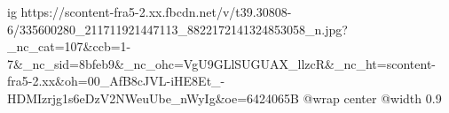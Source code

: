  
 
 
 
 


\ifcmt
  ig https://scontent-fra5-2.xx.fbcdn.net/v/t39.30808-6/335600280_211711921447113_8822172141324853058_n.jpg?_nc_cat=107&ccb=1-7&_nc_sid=8bfeb9&_nc_ohc=VgU9GLlSUGUAX_llzcR&_nc_ht=scontent-fra5-2.xx&oh=00_AfB8cJVL-iHE8Et_-HDMIzrjg1s6eDzV2NWeuUbe_nWyIg&oe=6424065B
  @wrap center
  @width 0.9
\fi

